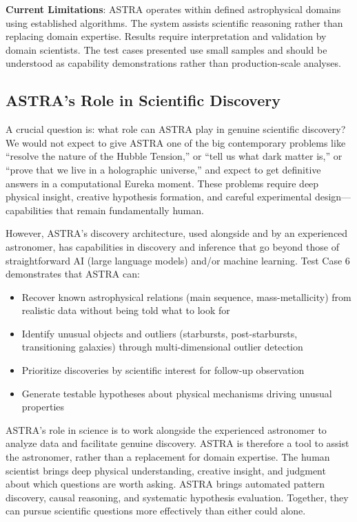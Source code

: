 \documentclass[usenatbib]{rasti}
\begin{document}
\textbf{Current Limitations}: ASTRA operates within defined astrophysical domains using established algorithms. The system assists scientific reasoning rather than replacing domain expertise. Results require interpretation and validation by domain scientists. The test cases presented use small samples and should be understood as capability demonstrations rather than production-scale analyses.

\subsection{ASTRA's Role in Scientific Discovery}

A crucial question is: what role can ASTRA play in genuine scientific discovery? We would not expect to give ASTRA one of the big contemporary problems like ``resolve the nature of the Hubble Tension,'' or ``tell us what dark matter is,'' or ``prove that we live in a holographic universe,'' and expect to get definitive answers in a computational Eureka moment. These problems require deep physical insight, creative hypothesis formation, and careful experimental design---capabilities that remain fundamentally human.

However, ASTRA's discovery architecture, used alongside and by an experienced astronomer, has capabilities in discovery and inference that go beyond those of straightforward AI (large language models) and/or machine learning. Test Case 6 demonstrates that ASTRA can:
\begin{itemize}
\item Recover known astrophysical relations (main sequence, mass-metallicity) from realistic data without being told what to look for
\item Identify unusual objects and outliers (starbursts, post-starbursts, transitioning galaxies) through multi-dimensional outlier detection
\item Prioritize discoveries by scientific interest for follow-up observation
\item Generate testable hypotheses about physical mechanisms driving unusual properties
\end{itemize}

ASTRA's role in science is to work alongside the experienced astronomer to analyze data and facilitate genuine discovery. ASTRA is therefore a tool to assist the astronomer, rather than a replacement for domain expertise. The human scientist brings deep physical understanding, creative insight, and judgment about which questions are worth asking. ASTRA brings automated pattern discovery, causal reasoning, and systematic hypothesis evaluation. Together, they can pursue scientific questions more effectively than either could alone.
\end{document}
